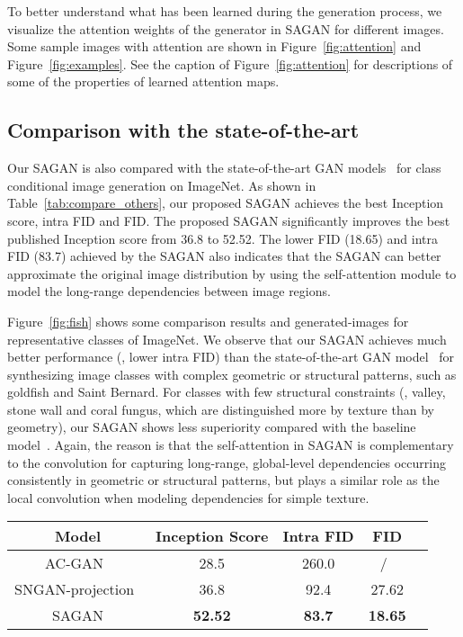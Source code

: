 \documentclass{article}
\begin{document}
To better understand what has been learned during the generation process, we visualize the attention weights of the generator in SAGAN for different images. Some sample images with attention are shown in Figure~\ref{fig:attention} and Figure~\ref{fig:examples}. 
See the caption of Figure~\ref{fig:attention} for descriptions of some of the properties of learned attention maps. 



\subsection{Comparison with the state-of-the-art} \label{sec:sagan_compare}

Our SAGAN is also compared with the state-of-the-art GAN models~\cite{Odena2016,Miyato18b} for class conditional image generation on ImageNet. As shown in Table~\ref{tab:compare_others}, our proposed SAGAN achieves the best Inception score, intra FID and FID. The proposed SAGAN significantly improves the best published Inception score from 36.8 to 52.52. The lower FID (18.65) and intra FID (83.7) achieved by the SAGAN also indicates that the SAGAN can better approximate the original image distribution by using the self-attention module to model the long-range dependencies between image regions. 

Figure~\ref{fig:fish} shows some comparison results and generated-images for representative classes of ImageNet.  We observe that our SAGAN achieves much better performance (\ie, lower intra FID) than the state-of-the-art GAN model~\cite{Miyato18b} for synthesizing image classes with complex geometric or structural patterns, such as goldfish and Saint Bernard. For classes with few structural constraints (\eg, valley, stone wall and coral fungus, which are distinguished more by texture than by geometry), our SAGAN shows less superiority compared with the baseline model~\cite{Miyato18b}. Again, the reason is that the self-attention in SAGAN is complementary to the convolution for capturing long-range, global-level dependencies occurring consistently in geometric or structural patterns, but plays a similar role as the local convolution when modeling dependencies for simple texture.  
\begin{table*}[bt]
\begin{center}
\normalfont
\begin{tabular}{|c|c|c|c|c|}
\hline
Model                & Inception Score   &Intra FID   & FID \\
\hline
AC-GAN~\cite{Odena2016}              &28.5  &260.0       &/\ \\
\hline
SNGAN-projection~\cite{Miyato18b} &36.8  &92.4        & 27.62 \\
\hline
SAGAN                             &\bf52.52 &\bf 83.7 &\bf18.65 \\
\hline
\end{tabular}
\end{center}
\caption{Comparison of the proposed SAGAN with state-of-the-art GAN models~\cite{Odena2016,Miyato18b} for class conditional image generation on ImageNet. FID of SNGAN-projection is calculated from officially released weights.}
\label{tab:compare_others} 
\end{table*}
\end{document}
